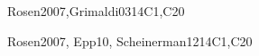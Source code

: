 \begin{syllabus}
 \begin{unit}{\DSBasicLogic}{}{Rosen2007,Grimaldi03}{14}{C1,C20}
   \begin{topics}
        \item \DSBasicLogicTopicPropositional%
        \item \DSBasicLogicTopicLogical%
        \item \DSBasicLogicTopicTruth%
        \item \DSBasicLogicTopicNormal%
        \item \DSBasicLogicTopicValidity%
        \item \DSBasicLogicTopicPropositionalInference%
        \item \DSBasicLogicTopicPredicate%
        \item \DSBasicLogicTopicLimitations%
   \end{topics}
   \begin{learningoutcomes}
	\item \DSBasicLogicLOConvertLogical [\Usage ]
	\item \DSBasicLogicLOApplyFormal [\Usage ]
	\item \DSBasicLogicLOUseThe [\Usage]
	\item \DSBasicLogicLODescribeHowCan [\Familiarity]
	\item \DSBasicLogicLOApplyFormalAnd [\Usage ]
	\item \DSBasicLogicLODescribeTheLimitationsAnd [\Usage]
   \end{learningoutcomes}
 \end{unit}

\begin{unit}{\DSProofTechniques}{}{Rosen2007, Epp10, Scheinerman12}{14}{C1,C20}
\begin{topics}
        \item \DSProofTechniquesTopicNotions%
        \item \DSProofTechniquesTopicThe%
        \item \DSProofTechniquesTopicDirect%
        \item \DSProofTechniquesTopicDisproving%
        \item \DSProofTechniquesTopicProof%
        \item \DSProofTechniquesTopicInduction%
        \item \DSProofTechniquesTopicStructural%
        \item \DSProofTechniquesTopicWeak%
        \item \DSProofTechniquesTopicRecursive%
        \item \DSProofTechniquesTopicWell%
\end{topics}


\end{unit}
\end{syllabus}
